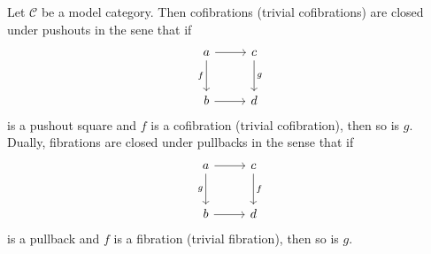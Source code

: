 \begin{corollary}\label{1.1.20}
	Let $\mathcal{C} $ be a model category. Then cofibrations (trivial cofibrations) are closed under pushouts in the sene that if
	\[\begin{tikzcd}[row sep = 2.5em, column sep = 2.5em]
	a \ar[r] \ar[" f "', d]  & c \ar[" g ", d]  \\
	b \ar[r]  & d
	\end{tikzcd}\]
	is a pushout square and $f$ is a cofibration (trivial cofibration), then so is $g$. Dually, fibrations are closed under pullbacks in the sense that if
	\[\begin{tikzcd}[row sep = 2.5em, column sep = 2.5em]
	a \ar[r] \ar[" g "', d]  & c \ar[" f ", d]  \\
	b \ar[r]  & d
	\end{tikzcd}\]
	is a pullback and $f$ is a fibration (trivial fibration), then so is $g$.
\end{corollary}
